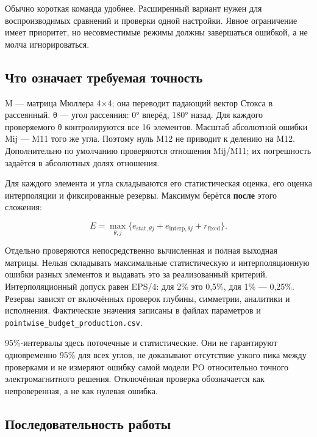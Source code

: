 Обычно короткая команда удобнее. Расширенный вариант нужен для
воспроизводимых сравнений и проверки одной настройки. Явное ограничение
имеет приоритет, но несовместимые режимы должны завершаться ошибкой, а
не молча игнорироваться.

\subsection{Что означает требуемая
точность}\label{ux447ux442ux43e-ux43eux437ux43dux430ux447ux430ux435ux442-ux442ux440ux435ux431ux443ux435ux43cux430ux44f-ux442ux43eux447ux43dux43eux441ux442ux44c}

M --- матрица Мюллера 4×4; она переводит падающий вектор Стокса в
рассеянный. θ --- угол рассеяния: 0° вперёд, 180° назад. Для каждого
проверяемого θ контролируются все 16 элементов. Масштаб абсолютной
ошибки Mij --- M11 того же угла. Поэтому нуль M12 не приводит к делению
на M12. Дополнительно по умолчанию проверяются отношения Mij/M11; их
погрешность задаётся в абсолютных долях отношения.

Для каждого элемента и угла складываются его статистическая оценка, его
оценка интерполяции и фиксированные резервы. Максимум берётся
\textbf{после} этого сложения:

\[E=\max_{\theta,j}\{e_{\mathrm{stat},\theta j}
+e_{\mathrm{interp},\theta j}+r_{\mathrm{fixed}}\}.\]

Отдельно проверяются непосредственно вычисленная и полная выходная
матрицы. Нельзя складывать максимальные статистическую и
интерполяционную ошибки разных элементов и выдавать это за реализованный
критерий. Интерполяционный допуск равен EPS/4: для 2\% это 0,5\%, для
1\% --- 0,25\%. Резервы зависят от включённых проверок глубины,
симметрии, аналитики и исполнения. Фактические значения записаны в
файлах параметров и \nolinkurl{pointwise_budget_production.csv}.

95\%-интервалы здесь поточечные и статистические. Они не гарантируют
одновременно 95\% для всех углов, не доказывают отсутствие узкого пика
между проверками и не измеряют ошибку самой модели PO относительно
точного электромагнитного решения. Отключённая проверка обозначается как
непроверенная, а не как нулевая ошибка.

\subsection{Последовательность
работы}\label{ux43fux43eux441ux43bux435ux434ux43eux432ux430ux442ux435ux43bux44cux43dux43eux441ux442ux44c-ux440ux430ux431ux43eux442ux44b}


